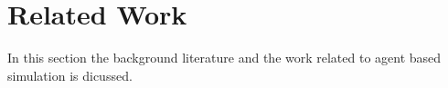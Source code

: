 \chapter{Related Work\label{ch:pastwork}}

In this section the background literature and the work related to agent based simulation is dicussed. 





